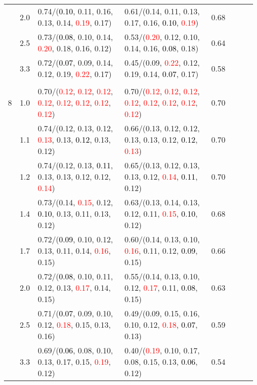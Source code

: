 \documentclass[10pt,a4paper]{report}
\begin{document}
\begin{table}[!htbp]
\begin{center}
{\begin{tabular}{ccllcccc}
			&2.0&0.74/(\textcolor{black}{0.10}, 0.11, 0.16, 0.13, 0.14, \textcolor{red}{0.19}, 0.17)&0.61/(0.14, 0.11, 0.13, 0.17, 0.16, \textcolor{black}{0.10}, \textcolor{red}{0.19})&0.68\\
			&2.5&0.73/(\textcolor{black}{0.08}, 0.10, 0.14, \textcolor{red}{0.20}, 0.18, 0.16, 0.12)&0.53/(\textcolor{red}{0.20}, 0.12, 0.10, 0.14, 0.16, \textcolor{black}{0.08}, 0.18)&0.64\\
			&3.3&0.72/(\textcolor{black}{0.07}, 0.09, 0.14, 0.12, 0.19, \textcolor{red}{0.22}, 0.17)&0.45/(0.09, \textcolor{red}{0.22}, 0.12, 0.19, 0.14, \textcolor{black}{0.07}, 0.17)&0.58\\
			&&&&\\
			8			&1.0&0.70/(\textcolor{red}{0.12}, \textcolor{red}{0.12}, \textcolor{red}{0.12}, \textcolor{red}{0.12}, \textcolor{red}{0.12}, \textcolor{red}{0.12}, \textcolor{red}{0.12}, \textcolor{red}{0.12})&0.70/(\textcolor{red}{0.12}, \textcolor{red}{0.12}, \textcolor{red}{0.12}, \textcolor{red}{0.12}, \textcolor{red}{0.12}, \textcolor{red}{0.12}, \textcolor{red}{0.12}, \textcolor{red}{0.12})&0.70\\
			&1.1&0.74/(0.12, 0.13, 0.12, \textcolor{red}{0.13}, 0.13, \textcolor{black}{0.12}, 0.13, 0.12)&0.66/(0.13, 0.12, 0.12, 0.13, 0.13, 0.12, \textcolor{black}{0.12}, \textcolor{red}{0.13})&0.70\\
			&1.2&0.74/(0.12, 0.13, \textcolor{black}{0.11}, 0.13, 0.13, 0.12, 0.12, \textcolor{red}{0.14})&0.65/(0.13, 0.12, 0.13, 0.13, 0.12, \textcolor{red}{0.14}, \textcolor{black}{0.11}, 0.12)&0.70\\
			&1.4&0.73/(0.14, \textcolor{red}{0.15}, 0.12, \textcolor{black}{0.10}, 0.13, 0.11, 0.13, 0.12)&0.63/(0.13, 0.14, 0.13, 0.12, 0.11, \textcolor{red}{0.15}, \textcolor{black}{0.10}, 0.12)&0.68\\
			&1.7&0.72/(\textcolor{black}{0.09}, 0.10, 0.12, 0.13, 0.11, 0.14, \textcolor{red}{0.16}, 0.15)&0.60/(0.14, 0.13, 0.10, \textcolor{red}{0.16}, 0.11, 0.12, \textcolor{black}{0.09}, 0.15)&0.66\\
			&2.0&0.72/(\textcolor{black}{0.08}, 0.10, 0.11, 0.12, 0.13, \textcolor{red}{0.17}, 0.14, 0.15)&0.55/(0.14, 0.13, 0.10, 0.12, \textcolor{red}{0.17}, 0.11, \textcolor{black}{0.08}, 0.15)&0.63\\
			&2.5&0.71/(\textcolor{black}{0.07}, 0.09, 0.10, 0.12, \textcolor{red}{0.18}, 0.15, 0.13, 0.16)&0.49/(0.09, 0.15, 0.16, 0.10, 0.12, \textcolor{red}{0.18}, \textcolor{black}{0.07}, 0.13)&0.59\\
			&3.3&0.69/(\textcolor{black}{0.06}, 0.08, 0.10, 0.13, 0.17, 0.15, \textcolor{red}{0.19}, 0.12)&0.40/(\textcolor{red}{0.19}, 0.10, 0.17, 0.08, 0.15, 0.13, \textcolor{black}{0.06}, 0.12)&0.54\\
			\bottomrule
		\end{tabular}}
	\end{center}
\end{table}
\end{document}
